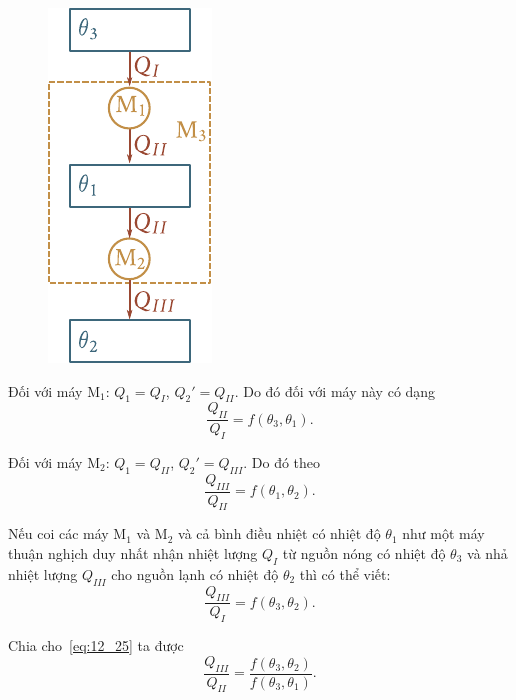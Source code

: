 \begin{figure}[!htb]
	\begin{center}
		\includegraphics[scale=1.0]{figures/ch_12/fig_12_5.pdf}
		\caption[]{}
		\label{fig:12_5}
	\end{center}
	\vspace{-0.8cm}
\end{figure}

Đối với máy M$_1$: $Q_1=Q_I$, $Q_2'=Q_{II}$. Do đó  đối với máy này có dạng
\begin{equation}\label{eq:12_25}
	\frac{Q_{II}}{Q_I} = f(\theta_3,\theta_1).
\end{equation}

\noindent
Đối với máy M$_2$: $Q_1=Q_{II}$, $Q_2'=Q_{III}$. Do đó theo 
\begin{equation}\label{eq:12_26}
	\frac{Q_{III}}{Q_{II}} = f(\theta_1,\theta_2).
\end{equation}

\noindent
Nếu coi các máy M$_1$ và M$_2$ và cả bình điều nhiệt có nhiệt độ $\theta_1$ như một máy thuận nghịch duy nhất nhận nhiệt lượng $Q_I$ từ nguồn nóng có nhiệt độ $\theta_3$ và nhả nhiệt lượng $Q_{III}$ cho nguồn lạnh có nhiệt độ $\theta_2$ thì có thể viết:
\begin{equation}\label{eq:12_27}
	\frac{Q_{III}}{Q_{I}} = f(\theta_3,\theta_2).
\end{equation}

Chia  cho~\eqref{eq:12_25} ta được
\begin{equation*}
	\frac{Q_{III}}{Q_{II}} = \frac{f(\theta_3,\theta_2)}{f(\theta_3,\theta_1)}.
\end{equation*}

